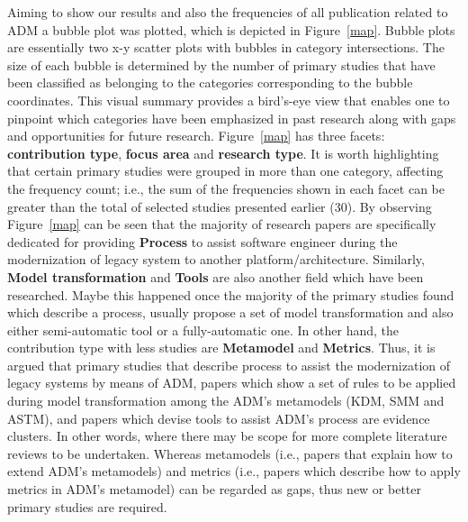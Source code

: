 Aiming to show our results and also the frequencies of all publication related to ADM a bubble plot was plotted, which is depicted in Figure~\ref{map}. Bubble plots are essentially two x-y scatter plots with bubbles in category intersections. The size of each bubble is determined by the number of primary studies that have been classified as belonging to the categories corresponding to the bubble coordinates. This visual summary provides a bird's-eye view that enables one to pinpoint which categories have been emphasized in past research along with gaps and opportunities for future research.
%
Figure~\ref{map} has three facets: \textbf{contribution type}, \textbf{focus area} and \textbf{research type}. 
%
%
It is worth highlighting that certain primary studies were grouped in more than one category, affecting the frequency count; i.e., the sum of the frequencies shown in each facet can be greater than the total of selected studies presented earlier (30). By observing Figure~\ref{map} can be seen that the majority of research papers are specifically dedicated for providing \textbf{Process} to assist software engineer during the modernization of legacy system to another platform/architecture. Similarly, \textbf{Model transformation} and \textbf{Tools} are also another field which have been researched. Maybe this happened once the majority of the primary studies found which describe a process, usually propose a set of model transformation and also either semi-automatic tool or a fully-automatic one. In other hand, the contribution type with less studies are \textbf{Metamodel} and \textbf{Metrics}. Thus, it is argued that primary studies that describe process to assist the modernization of legacy systems by means of ADM, papers which show a set of rules to be applied during model transformation among the ADM's metamodels (KDM, SMM and ASTM), and papers which devise tools to assist ADM's process are evidence clusters. In other words, where there may be scope for more complete literature reviews to be undertaken. Whereas metamodels (i.e., papers that explain how to extend ADM's metamodels) and metrics (i.e., papers which describe how to apply metrics in ADM's metamodel) can be regarded as gaps, thus new or better primary studies are required. 



